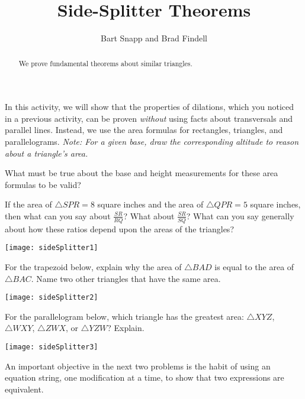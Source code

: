 \documentclass[nooutcomes]{ximera}
\title{Side-Splitter Theorems}
\author{Bart Snapp and Brad Findell}
\begin{document}
\begin{abstract}
  We prove fundamental theorems about similar triangles.
\end{abstract}
\maketitle

In this activity, we will show that the properties of dilations, which you noticed in a previous activity, can be proven \emph{without} using facts about transversals and parallel lines.  Instead, we use the area formulas for rectangles, triangles, and 
parallelograms.  \emph{Note: For a given base, draw the corresponding altitude to reason about a triangle's area.}
\begin{question}
What must be true about the base and height measurements for these area formulas to be valid?
\end{question}

\begin{problem}
If the area of $\triangle SPR = 8$ square inches and the area of $\triangle QPR = 5$ square inches, then what can you say about $\frac{SR}{RQ}$?  What about $\frac{SR}{SQ}$?  What can you say generally about how these ratios depend upon the areas of the triangles?  
\begin{image}
\texttt{[image: sideSplitter1]}
\end{image}
\end{problem}

\begin{problem}
For the trapezoid below, explain why the area of $\triangle BAD$ is equal to the area of $\triangle BAC$.  Name two other triangles that have the same area.
\begin{image}
\texttt{[image: sideSplitter2]}
\end{image}
\end{problem}

\begin{problem}
For the parallelogram below, which triangle has the greatest area: $\triangle XYZ$, $\triangle WXY$, $\triangle ZWX$, or $\triangle YZW$?  Explain.  
\begin{image}
\texttt{[image: sideSplitter3]}
\end{image}
\end{problem}

\begin{teachingnote}
An important objective in the next two problems is the habit of using an equation string, one modification at a time, to show that two expressions are equivalent.
\end{teachingnote}
\end{document}
